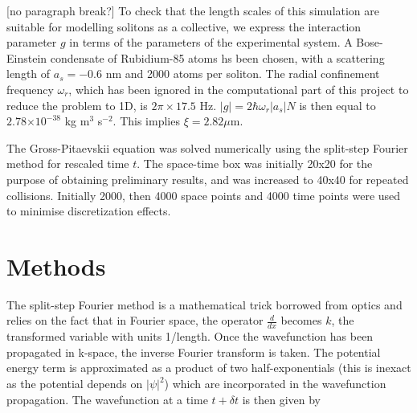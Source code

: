 \documentclass[10pt, twocolumn]{revtex4}    %
\providecommand{\e}[1]{\ensuremath{\times 10^{#1}}} %
\begin{document}
[no paragraph break?] To check that the length scales of this simulation are suitable for modelling solitons as a collective, we express the interaction parameter $g$ in terms of the parameters of the experimental system. A Bose-Einstein condensate of Rubidium-85 atoms hs been chosen, with a scattering length of $a_s = -0.6$ nm and 2000 atoms per soliton. The radial confinement frequency $\omega_r$, which has been ignored in the computational part of this project to reduce the problem to 1D, is $2\pi \times 17.5$ Hz. $|g| = 2\hbar \omega_r |a_s| N$ is then equal to $2.78 \e{-38}$ kg m$^3$ s$^{-2}$. This implies $\xi = 2.82 \mu$m.

The Gross-Pitaevskii equation was solved numerically using the split-step Fourier method for rescaled time $t$. The space-time box was initially 20x20 for the purpose of obtaining preliminary results, and was increased to 40x40 for repeated collisions. Initially 2000, then 4000 space points and 4000 time points were used to minimise discretization effects. %


\section{Methods} \label{Methods}

The split-step Fourier method is a mathematical trick borrowed from optics and relies on the fact that in Fourier space, the operator $\frac{d}{dx}$ becomes $k$, the transformed variable with units 1/length. Once the wavefunction has been propagated in k-space, the inverse Fourier transform is taken. The potential energy term is approximated as a product of two half-exponentials (this is inexact as the potential depends on $|\psi|^2$) which are incorporated in the wavefunction propagation. The wavefunction at a time $t+\delta t$ is then given by
\end{document}
